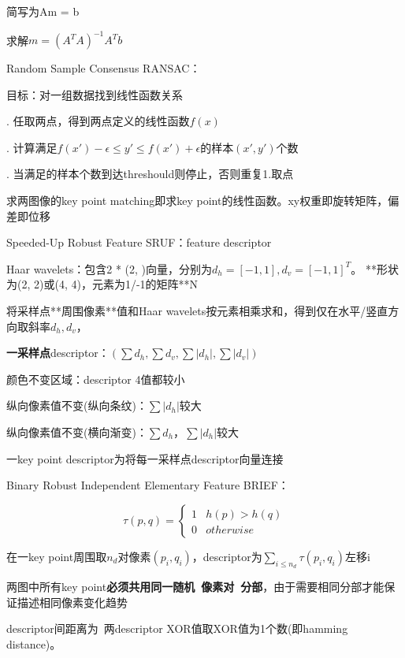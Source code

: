 \documentclass[UTF8]{ctexart}
\begin{document}
  \quad \quad \quad 简写为Am = b

  \quad \quad \quad 求解$m = (A^TA)^{-1}A^Tb$

  Random Sample Consensus RANSAC：

  \quad 目标：对一组数据找到线性函数关系

  . 任取两点，得到两点定义的线性函数$f(x)$

  . 计算满足$f(x') - \epsilon \leq y' \leq f(x') + \epsilon$的样本$(x', y')$个数

  . 当满足的样本个数到达threshould则停止，否则重复1.取点

  \quad 求两图像的key point matching即求key point的线性函数。xy权重即旋转矩阵，偏差即位移
  
  Speeded-Up Robust Feature SRUF：feature descriptor

  \quad Haar wavelets：包含2 * (2, )向量，分别为$d_h = [-1, 1], d_v = [-1, 1]^T$。 **形状为(2, 2)或(4, 4)，元素为1/-1的矩阵**N
  
  \quad 将采样点**周围像素**值和Haar wavelets按元素相乘求和，得到仅在水平/竖直方向取斜率$d_h, d_v$，

  \quad \textbf{一采样点}descriptor：$(\sum d_h, \sum d_v, \sum |d_h|, \sum |d_v|)$

  \quad \quad 颜色不变区域：descriptor 4值都较小

  \quad \quad 纵向像素值不变(纵向条纹)：$\sum |d_h|$较大 

  \quad \quad 纵向像素值不变(横向渐变)：$\sum d_h$，$\sum |d_h|$较大

  \quad 一key point descriptor为将每一采样点descriptor向量连接

  Binary Robust Independent Elementary Feature BRIEF：

  \quad \begin{equation*}
      \tau(p, q) = \begin{cases}
      1 & h(p) > h(q)\\
      0 & otherwise
      \end{cases}
    \end{equation*}

  \quad 在一key point周围取$n_d$对像素$(p_i, q_i)$，descriptor为$\sum_{i \leq n_d} \tau(p_i, q_i)$左移i

  \quad \quad 两图中所有key point\textbf{必须共用同一随机\ 像素对\ 分部}，由于需要相同分部才能保证描述相同像素变化趋势

  \quad descriptor间距离为\ 两descriptor XOR值取XOR值为1个数(即hamming distance)。
\end{document}
